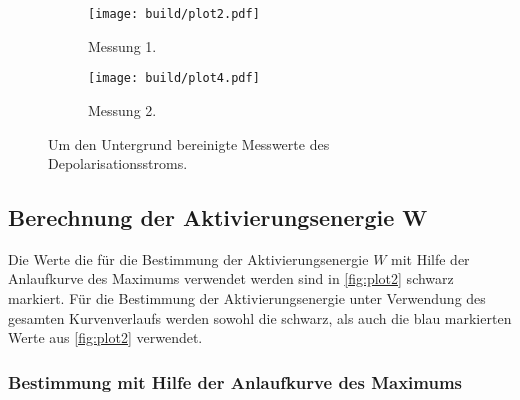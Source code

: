 \begin{figure}[H]
  \begin{subfigure}{\textwidth}
  \centering
  \texttt{[image: build/plot2.pdf]}
  \caption{Messung 1.}
  \label{fig:plot2a}
  \end{subfigure}
  \hfill
  \begin{subfigure}{\textwidth}
  \centering
  \texttt{[image: build/plot4.pdf]}
  \caption{Messung 2.}
  \label{fig:plot2b}
  \end{subfigure}
  \caption{Um den Untergrund bereinigte Messwerte des Depolarisationsstroms.}
  \label{fig:plot2}
\end{figure}



\subsection{Berechnung der Aktivierungsenergie W}
\label{subsec:Aktivierungsenergie}

Die Werte die für die Bestimmung der Aktivierungsenergie $W$ mit Hilfe der Anlaufkurve des Maximums verwendet werden sind in \autoref{fig:plot2}
schwarz markiert.
Für die Bestimmung der Aktivierungsenergie unter Verwendung des gesamten Kurvenverlaufs werden sowohl die schwarz, als auch die blau
markierten Werte aus \autoref{fig:plot2} verwendet.

\subsubsection{Bestimmung mit Hilfe der Anlaufkurve des Maximums}

